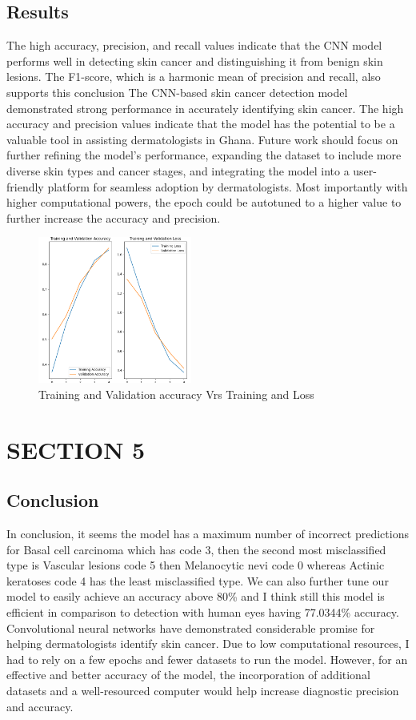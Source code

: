\documentclass[twocolumn]{article}
\begin{document}
\subsection{Results}
The high accuracy, precision, and recall values indicate that the CNN model performs well in detecting skin cancer and distinguishing it from benign skin lesions. The F1-score, which is a harmonic mean of precision and recall, also supports this conclusion 
The CNN-based skin cancer detection model demonstrated strong performance in accurately identifying skin cancer. The high accuracy and precision values indicate that the model has the potential to be a valuable tool in assisting dermatologists in Ghana. Future work should focus on further refining the model's performance, expanding the dataset to include more diverse skin types and cancer stages, and integrating the model into a user-friendly platform for seamless adoption by dermatologists. Most importantly with higher computational powers, the epoch could be autotuned to a higher value to further increase the accuracy and precision. 
\begin{figure}[H]
  \centering
  \includegraphics[width=0.45\textwidth]{trainloss.png}
  \caption{Training and Validation accuracy Vrs Training and Loss}
  \label{fig:image}
\end{figure}
\raggedbottom





\section{SECTION 5}
\subsection{Conclusion}
In conclusion, it seems the model has a maximum number of incorrect predictions for Basal cell carcinoma which has code 3, then the second most misclassified type is Vascular lesions code 5 then Melanocytic nevi code 0 whereas Actinic keratoses code 4 has the least misclassified type.
We can also further tune our model to easily achieve an accuracy above 80\% and I think still this model is efficient in comparison to detection with human eyes having 77.0344\% accuracy.
Convolutional neural networks have demonstrated considerable promise for helping dermatologists identify skin cancer. Due to low computational resources, I had to rely on a few epochs and fewer datasets to run the model. However, for an effective and better accuracy of the model, the incorporation of additional datasets and a well-resourced computer would help increase diagnostic precision and accuracy.





\end{document}
